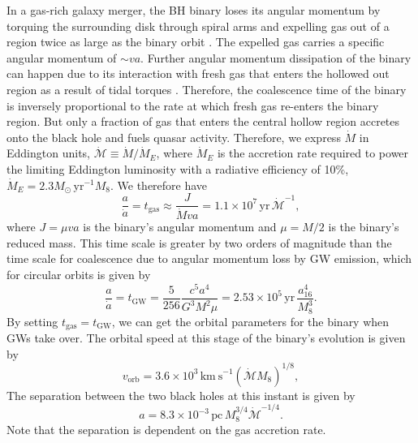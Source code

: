 \documentclass[a4paper,fleqn,usenatbib]{mnras}
\begin{document}
In a gas-rich galaxy merger, the BH binary loses its angular momentum
by torquing the surrounding disk through spiral arms and expelling gas
out of a region twice as large as the binary orbit
\citep{2005ApJ...622L..93M, 2007PASJ...59..427H, 2008ApJ...672...83M,
  2009MNRAS.393.1423C}.  The expelled gas carries a specific angular
momentum of $\sim va$.  Further angular momentum dissipation of the
binary can happen due to its interaction with fresh gas that enters
the hollowed out region as a result of tidal torques
\citep{2008ApJ...672...83M, 2012ApJ...755...51N, 2012MNRAS.427.2680K,
  2012A&A...545A.127R}.  Therefore, the coalescence time of the binary
is inversely proportional to the rate at which fresh gas re-enters the
binary region.  But only a fraction of gas that enters the central
hollow region accretes onto the black hole and fuels quasar activity.
Therefore, we express $\dot M$ in Eddington units, $\dot{\mathcal
  M}\equiv\dot M /\dot M_E$, where $\dot M_E$ is the accretion rate
required to power the limiting Eddington luminosity with a radiative
efficiency of 10\%, $\dot M_E=2.3 M_\odot\, \mathrm{yr}^{-1}M_8$.  We
therefore have \citep{2010PhRvD..81d7503L}
\begin{equation}
  \frac{a}{\dot a} = t_\mathrm{gas}\approx\frac{J}{\dot Mva}=1.1\times 10^7\,
  \mathrm{yr}\,\dot{\mathcal M}^{-1},
\end{equation}
where $J=\mu va$ is the binary's angular momentum and $\mu=M/2$ is the
binary's reduced mass.  This time scale is greater by two orders of
magnitude than the time scale for coalescence due to angular momentum
loss by GW emission, which for circular orbits is given by
\citep{1964PhRv..136.1224P}
\begin{equation}
\frac{a}{\dot a} = t_\mathrm{GW} = \frac{5}{256}\frac{c^5a^4}{G^3M^2\mu}=2.53\times 10^5\,\mathrm{yr}\,\frac{a_{16}^4}{M_8^3}.
\end{equation}
By setting $t_\mathrm{gas}=t_\mathrm{GW}$, we can get the orbital
parameters for the binary when GWs take over.  The orbital speed at
this stage of the binary's evolution is given by
\begin{equation}
  v_\mathrm{orb} = 3.6\times 10^3\, \mathrm{km~s}^{-1}(\dot{\mathcal{M}}M_8)^{1/8},
  \label{eqn:v}
\end{equation}
The separation between the two black holes at this instant is given by
\begin{equation}
  a = 8.3\times 10^{-3}\, \mathrm{pc}\, M_8^{3/4}\dot{\mathcal{M}}^{-1/4}.
  \label{eqn:a}
\end{equation}
Note that the separation is dependent on the gas accretion rate.  
\end{document}
